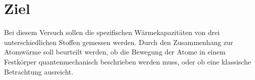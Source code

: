 \section{Ziel}

Bei diesem Versuch sollen die spezifischen Wärmekapazitäten
von drei unterschiedlichen Stoffen gemessen werden. 
Durch den Zusammenhang zur Atomwärme soll beurteilt werden, ob
die Bewegung der Atome in einem Festkörper
quantenmechanisch beschrieben werden muss, oder ob eine
klassische Betrachtung ausreicht.

